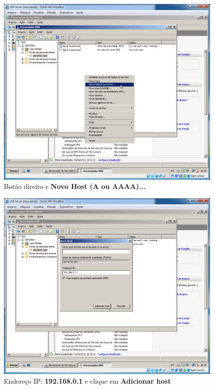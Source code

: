 \documentclass[10pt]{article}
\begin{document}
\begin{figure}[H]
    \centering
    \caption{Botão direito e \textbf{Novo Host (A ou AAAA)...}}
    \label{fig:DNS029}
    \includegraphics[width=\linewidth]{images/windows_server/dns/029.png}
\end{figure}
\begin{figure}[H]
    \centering
    \caption{Endereço IP: \textbf{192.168.0.1} e clique em \textbf{Adicionar host}}
    \label{fig:DNS030}
    \includegraphics[width=\linewidth]{images/windows_server/dns/030.png}
\end{figure}
\end{document}
